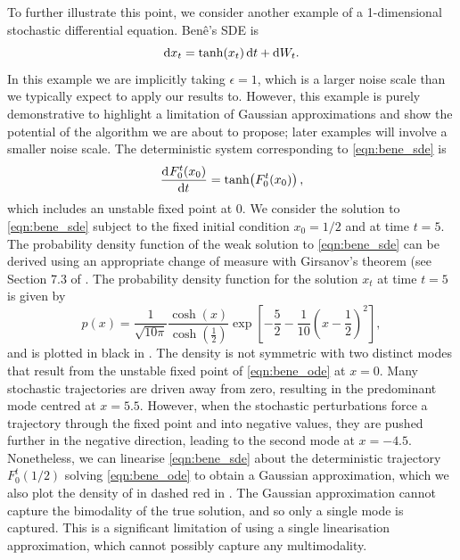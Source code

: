 To further illustrate this point, we consider another example of a 1-dimensional stochastic differential equation.
Ben\^e's SDE \citep{SarkkaSolin_2019_AppliedStochasticDifferential} is
\begin{equation}
	\dif x_t = \tanh\!\left(x_t\right)\dif t + \dif W_t.
	\label{eqn:bene_sde}
\end{equation}
In this example we are implicitly taking \(\epsilon = 1\), which is a larger noise scale than we typically expect to apply our results to.
However, this example is purely demonstrative to highlight a limitation of Gaussian approximations and show the potential of the algorithm we are about to propose; later examples will involve a smaller noise scale.
The deterministic system corresponding to \cref{eqn:bene_sde} is
\begin{equation}
	\dod{F_0^t\!\left(x_0\right)}{t} = \tanh\!\left(F_0^t\!\left(x_0\right)\right),
	\label{eqn:bene_ode}
\end{equation}
which includes an unstable fixed point at \(0\).
We consider the solution to \cref{eqn:bene_sde} subject to the fixed initial condition \(x_0 = 1/2\) and at time \(t = 5\).
The probability density function of the weak solution to \cref{eqn:bene_sde} can be derived using an appropriate change of measure with Girsanov's theorem (see Section 7.3 of \citet{SarkkaSolin_2019_AppliedStochasticDifferential}.
The probability density function for the solution \(x_t\) at time \(t = 5\) is given by
\begin{equation}\label{eqn:bene_sde_pdf}
	p(x) = \frac{1}{\sqrt{10\pi}}\frac{\cosh\left(x\right)}{\cosh\!\left(\frac12\right)}\exp\left[-\frac{5}{2} - \frac{1}{10}\left(x - \frac12\right)^2\right],
\end{equation}
and is plotted in black in .
The density is not symmetric with two distinct modes that result from the unstable fixed point of \cref{eqn:bene_ode} at \(x = 0\).
Many stochastic trajectories are driven away from zero, resulting in the predominant mode centred at \(x = 5.5\).
However, when the stochastic perturbations force a trajectory through the fixed point and into negative values, they are pushed further in the negative direction, leading to the second mode at \(x = -4.5\).
Nonetheless, we can linearise \cref{eqn:bene_sde} about the deterministic trajectory \(F_0^t\!\left(1/2\right)\) solving \cref{eqn:bene_ode} to obtain a Gaussian approximation, which we also plot the density of in dashed red in .
The Gaussian approximation cannot capture the bimodality of the true solution, and so only a single mode is captured.
This is a significant limitation of using a single linearisation approximation, which cannot possibly capture any multimodality.


